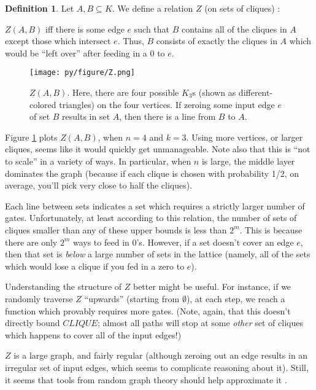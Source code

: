 \documentclass[12pt]{article}
\theoremstyle{definition}
\newtheorem{defn}{Definition}[section]
\begin{document}
\begin{defn}
\label{zRelation}
Let $A, B \subseteq K$. We define a relation $Z$ (on sets of cliques) :

$Z(A,B)$ iff there is some edge $e$ such that $B$ contains all of the
cliques in $A$ except those which intersect $e$. Thus, $B$ consists
of exactly the cliques in $A$ which would be ``left over'' after
feeding in a 0 to $e$.
\end{defn}

\begin{figure}
\centering
\texttt{[image: py/figure/Z.png]}
\caption{$Z(A,B).$ Here, there are four possible $K_3$s
(shown as different-colored triangles) on the four vertices.
If zeroing some input edge $e$ of set $B$ results in set $A$, then
there is a line from $B$ to $A$.
}

\label{fig:Z}
\end{figure}

Figure \ref{fig:Z} plots $Z(A,B)$, when $n=4$ and $k=3$.
Using more vertices, or
larger cliques, seems like it would quickly get unmanageable.
Note also that this is ``not to scale'' in a variety of ways. In
particular, when $n$ is large, the middle layer dominates the graph
(because if each clique is chosen with probability 1/2, on average,
you'll pick very close to half the cliques).

Each line between sets indicates a set which requires a strictly larger
number of gates.  Unfortunately, at least according to this relation,
the number of sets of cliques smaller than
any of these upper bounds is less than $2^m$. This is because
there are only $2^m$ ways to feed in 0's.
 However, if a set doesn't cover an edge $e$,
then that set is {\em below} a large number of sets in the lattice (namely,
all of the sets which would lose a clique if you fed in a zero to $e$).

Understanding the structure of $Z$ better might be useful.
For instance, if we randomly traverse $Z$ ``upwards'' (starting from $\emptyset$),
at each step, we reach a function which provably requires more gates. (Note,
again, that this doesn't directly bound $CLIQUE$; almost all paths will stop
at some {\em other} set of cliques which happens to cover all of the input edges!)

$Z$ is a large graph, and fairly regular (although zeroing out an edge results
in an irregular set of input edges, which seems to complicate reasoning about it).
Still, it seems that tools from
random graph theory should help approximate it \cite{bollobas1976cliques}.
\end{document}
